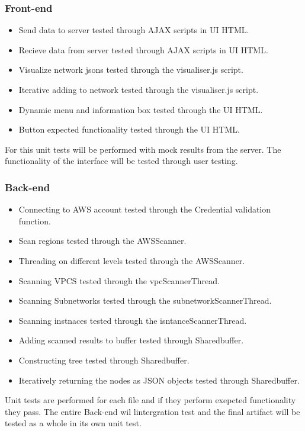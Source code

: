 \documentclass[hidelinks,a4paper,12pt]{article}
\begin{document}
\subsubsection{Front-end}
\begin{itemize}
  \item Send data to server tested through AJAX scripts in UI HTML.
  \item Recieve data from server tested through AJAX scripts in UI HTML.
  \item Visualize network jsons tested through the visualiser.js script.
  \item Iterative adding to network tested through the visualiser.js script.
  \item Dynamic menu and information box tested through the UI HTML.
  \item Button expected functionality tested through the UI HTML. 
\end{itemize}
For this unit tests will be performed with mock results from the server. The functionality of the interface will be tested through user testing.

\subsubsection{Back-end}
\begin{itemize}
  \item Connecting to AWS account tested through the Credential validation function.
  \item Scan regions tested through the AWSScanner.
  \item Threading on different levels tested through the AWSScanner.
  \item Scanning VPCS  tested through the vpcScannerThread.
   \item Scanning Subnetworks  tested through the subnetworkScannerThread.
    \item Scanning instnaces tested through the isntanceScannerThread.
  \item Adding scanned results to buffer tested through Sharedbuffer.
\item Constructing tree tested through Sharedbuffer.
  \item Iteratively returning the nodes as JSON objects tested through Sharedbuffer.
\end{itemize}
Unit tests are performed for each file and if they perform  exepcted functionality they pass. The entire Back-end wil lintergration test and the final artifact will be tested as a whole in its own unit test.
\end{document}
